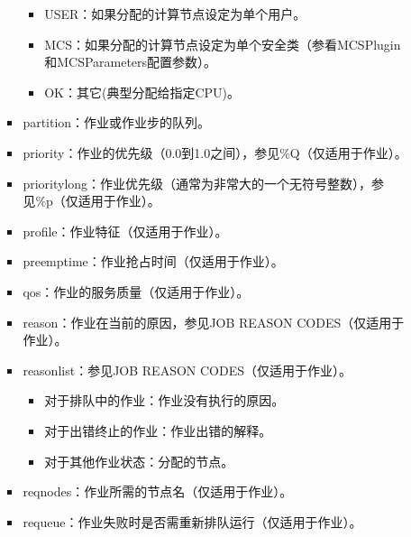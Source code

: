 \documentclass[a4paper,12pt,english]{sphinxmanual}
\begin{document}
\begin{itemize}
\begin{itemize}
\begin{itemize}
\begin{itemize}
\item {} 
\sphinxAtStartPar
USER：如果分配的计算节点设定为单个用户。

\item {} 
\sphinxAtStartPar
MCS：如果分配的计算节点设定为单个安全类（参看MCSPlugin和MCSParameters配置参数）。

\item {} 
\sphinxAtStartPar
OK：其它(典型分配给指定CPU)。

\end{itemize}

\item {} 
\sphinxAtStartPar
partition：作业或作业步的队列。

\item {} 
\sphinxAtStartPar
priority：作业的优先级（0.0到1.0之间），参见\%Q（仅适用于作业）。

\item {} 
\sphinxAtStartPar
prioritylong：作业优先级（通常为非常大的一个无符号整数），参见\%p（仅适用于作业）。

\item {} 
\sphinxAtStartPar
profile：作业特征（仅适用于作业）。

\item {} 
\sphinxAtStartPar
preemptime：作业抢占时间（仅适用于作业）。

\item {} 
\sphinxAtStartPar
qos：作业的服务质量（仅适用于作业）。

\item {} 
\sphinxAtStartPar
reason：作业在当前的原因，参见JOB REASON CODES（仅适用于作业）。

\item {} 
\sphinxAtStartPar
reasonlist：参见JOB REASON CODES（仅适用于作业）。
\begin{itemize}
\item {} 
\sphinxAtStartPar
对于排队中的作业：作业没有执行的原因。

\item {} 
\sphinxAtStartPar
对于出错终止的作业：作业出错的解释。

\item {} 
\sphinxAtStartPar
对于其他作业状态：分配的节点。

\end{itemize}

\item {} 
\sphinxAtStartPar
reqnodes：作业所需的节点名（仅适用于作业）。

\item {} 
\sphinxAtStartPar
requeue：作业失败时是否需重新排队运行（仅适用于作业）。


\end{itemize}
\end{itemize}
\end{itemize}
\end{document}
